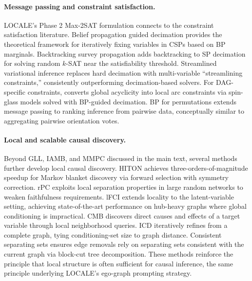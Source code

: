 \documentclass{article} %
\begin{document}
\paragraph{Message passing and constraint satisfaction.}
LOCALE's Phase 2 Max-2SAT formulation connects to the constraint satisfaction literature. Belief propagation guided decimation \citep{ricctersenghi2009cavity} provides the theoretical framework for iteratively fixing variables in CSPs based on BP marginals. Backtracking survey propagation \citep{marino2016backtracking} adds backtracking to SP decimation for solving random $k$-SAT near the satisfiability threshold. Streamlined variational inference \citep{grover2018streamline} replaces hard decimation with multi-variable ``streamlining constraints,'' consistently outperforming decimation-based solvers. For DAG-specific constraints, \citet{zhou2016spinglass} converts global acyclicity into local arc constraints via spin-glass models solved with BP-guided decimation. BP for permutations \citep{cantwell2022bpperm} extends message passing to ranking inference from pairwise data, conceptually similar to aggregating pairwise orientation votes.

\paragraph{Local and scalable causal discovery.}
Beyond GLL, IAMB, and MMPC discussed in the main text, several methods further develop local causal discovery. HITON \citep{aliferis2003hiton} achieves three-orders-of-magnitude speedup for Markov blanket discovery via forward selection with symmetry correction. rPC \citep{sondhi2019rpc} exploits local separation properties in large random networks to weaken faithfulness requirements. lFCI \citep{chen2023lfci} extends locality to the latent-variable setting, achieving state-of-the-art performance on hub-heavy graphs where global conditioning is impractical. CMB \citep{gao2015cmb} discovers direct causes and effects of a target variable through local neighborhood queries. ICD \citep{rohekar2021icd} iteratively refines from a complete graph, tying conditioning-set size to graph distance. Consistent separating sets \citep{li2019consistent} ensures edge removals rely on separating sets consistent with the current graph via block-cut tree decomposition. These methods reinforce the principle that local structure is often sufficient for causal inference, the same principle underlying LOCALE's ego-graph prompting strategy.
\end{document}
